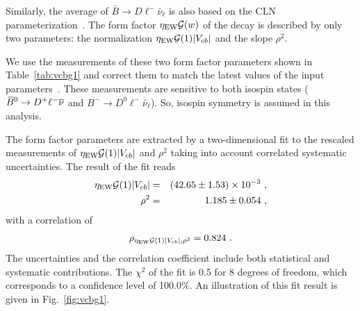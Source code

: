 \label{slbdecays_dlnu}

Similarly, the average of $\bar B\to D\ell^-\bar\nu_\ell$ is also
based on the CLN parameterization~\cite{CLN}. The form factor
$\eta_\mathrm{EW}{\cal G}(w)$ of the decay is described by only two
parameters: the normalization $\eta_\mathrm{EW}{\cal G}(1)|V_{cb}|$ and
the slope $\rho^2$.

We use the measurements of these two form factor parameters shown in
Table~\ref{tab:vcbg1} and correct them to match the latest values of
the input parameters~\cite{HFAG_sl:inputparams}. These measurements
are sensitive to both isospin states ($\kern 0.18em\overline{\kern -0.18em B}{}^0 \to D^{+}\ell^{-}\overline{\nu}$ and $B^-\to
D^0\ell^-\bar\nu_\ell$). So, isospin symmetry is assumed in this analysis.


The form factor parameters are extracted by a two-dimensional fit to
the rescaled measurements of $\eta_\mathrm{EW}{\cal G}(1)|V_{cb}|$ and
$\rho^2$ taking into account correlated systematic uncertainties. The
result of the fit reads
\begin{eqnarray}
  \eta_\mathrm{EW}{\cal G}(1)|V_{cb}| & = & (42.65\pm 1.53)\times
  10^{-3}~, \label{eq:vcbg1} \\
  \rho^2 & = & 1.185 \pm 0.054~,
\end{eqnarray}
with a correlation of
\begin{equation}
  \rho_{\eta_\mathrm{EW}{\cal G}(1)|V_{cb}|,\rho^2} = 0.824~.
\end{equation}
The uncertainties and the correlation coefficient include both
statistical and systematic contributions. The $\chi^2$ of the fit is
0.5 for 8 degrees of freedom, which corresponds to a confidence
level of 100.0\%. An illustration of this fit result is given in
Fig.~\ref{fig:vcbg1}.
